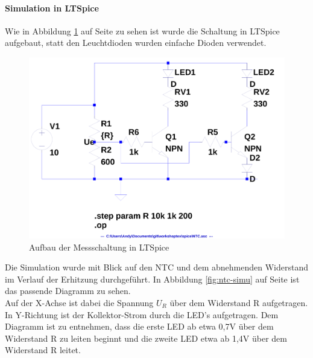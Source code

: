 \paragraph{Simulation in LTSpice}

Wie in Abbildung \ref{fig:ntc-spice} auf Seite \pageref{fig:ntc-spice} zu sehen ist wurde die Schaltung in LTSpice aufgebaut, statt den Leuchtdioden wurden einfache Dioden verwendet.\\

\begin{figure}[h!]
	\centering
	\includegraphics[scale=0.4]{pics/NTC-Circuit}
	\caption{Aufbau der Messschaltung in LTSpice}
	\label{fig:ntc-spice}
\end{figure}

Die Simulation wurde mit Blick auf den NTC und dem abnehmenden Widerstand im Verlauf der Erhitzung durchgeführt. In Abbildung \ref{fig:ntc-simu} auf Seite \pageref{fig:ntc-simu} ist das passende Diagramm zu sehen.\\
Auf der X-Achse ist dabei die Spannung \(U_R\) über dem Widerstand R aufgetragen. In Y-Richtung ist der Kollektor-Strom durch die LED's aufgetragen. Dem Diagramm ist zu entnehmen, dass die erste LED ab etwa 0,7V über dem Widerstand R zu leiten beginnt und die zweite LED etwa ab 1,4V über dem Widerstand R leitet.

